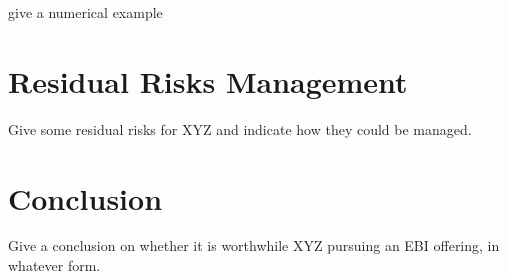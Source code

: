 \documentclass[12pt]{article}
\begin{document}
give a numerical example
\frameboxend

\section{Residual Risks Management}
Give some residual risks for XYZ and indicate how they could be managed. 

\section{Conclusion}
Give a conclusion on whether it is worthwhile XYZ pursuing an EBI offering, in whatever form. 

\printbibliography[heading=bibintoc]
\end{document}
